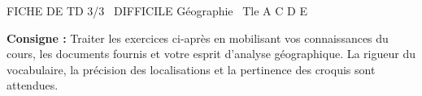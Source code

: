 \documentclass[11pt]{article}
\begin{document}
\begin{tcolorbox}[enhanced,colback=popink,colframe=popink,arc=10pt,boxrule=0pt,left=12pt,right=12pt,top=9pt,bottom=9pt]
{\color{white}\popxbold\small FICHE DE TD 3/3 \textbullet\ DIFFICILE \hfill Géographie \textbullet\ Tle A C D E\par}
\end{tcolorbox}
\vspace{4pt}
\noindent \textbf{Consigne :} Traiter les exercices ci-après en mobilisant vos connaissances du cours, les documents fournis et votre esprit d'analyse géographique. La rigueur du vocabulaire, la précision des localisations et la pertinence des croquis sont attendues.
\end{document}
